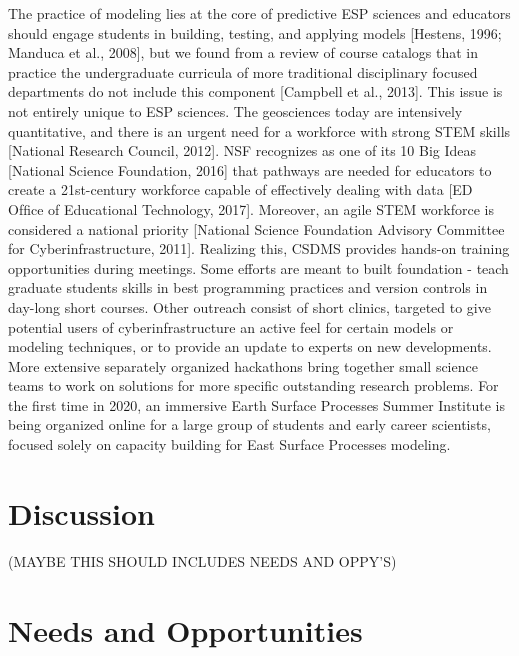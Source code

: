 \documentclass[12pt]{amsart}
\begin{document}
The practice of modeling lies at the core of predictive ESP sciences and educators should engage students in building, testing, and applying models [Hestens, 1996; Manduca et al., 2008], but we found from a review of course catalogs that in practice the undergraduate curricula of more traditional disciplinary focused departments do not include this component [Campbell et al., 2013]. This issue is not entirely unique to ESP sciences. The geosciences today are intensively quantitative, and there is an urgent need for a workforce with strong STEM skills [National Research Council, 2012]. NSF recognizes as one of its 10 Big Ideas [National Science Foundation, 2016] that pathways are needed for educators to create a 21st-century workforce capable of effectively dealing with data [ED Ofﬁce of Educational Technology, 2017]. Moreover, an agile STEM workforce is considered a national priority [National Science Foundation Advisory Committee for Cyberinfrastructure, 2011]. Realizing this, CSDMS provides hands-on training opportunities during meetings. Some efforts are meant to built foundation - teach graduate students skills in best programming practices and version controls in day-long short courses. Other outreach consist of short clinics, targeted to give potential users of cyberinfrastructure an active feel for certain models or modeling techniques, or to provide an update to experts on new developments.  More extensive separately organized hackathons bring together small science teams to work on solutions for more specific outstanding research problems.  For the first time in 2020, an immersive Earth Surface Processes Summer Institute is being organized online for a large group of students and early career scientists, focused solely on capacity building for East Surface Processes modeling.

\section{Discussion}
\label{sec:discussion}

(MAYBE THIS SHOULD INCLUDES NEEDS AND OPPY'S)

\section{Needs and Opportunities}
\end{document}
